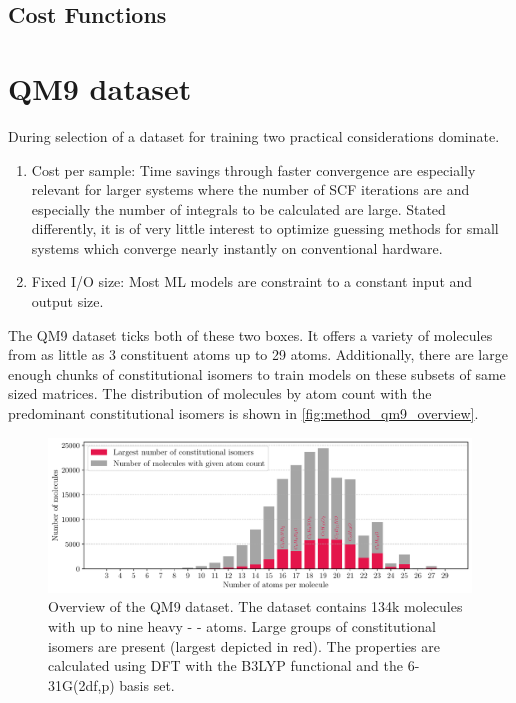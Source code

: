 \subsection{Cost Functions}
\label{subsec:background_cost_function}

\section{QM9 dataset \parencite{ref:data_qm9}}
\label{sec:qm9}
During selection of a dataset for training two practical considerations dominate. 
\begin{enumerate}
    \item Cost per sample: Time savings through faster convergence are especially relevant for larger systems where the number of SCF iterations are and especially the number of integrals to be calculated are large. Stated differently, it is of very little interest to optimize guessing methods for small systems which converge nearly instantly on conventional hardware. 
    \item Fixed I/O size: Most ML models are constraint to a constant input and output size. 
\end{enumerate}
The QM9 dataset \parencite{ref:article1_qm9,ref:article2_qm9} ticks both of these two boxes. It offers a variety of molecules from as little as 3 constituent atoms up to 29 atoms. Additionally, there are large enough chunks of constitutional isomers to train models on these subsets of same sized matrices. The distribution of molecules by atom count with the predominant constitutional isomers is shown in \autoref{fig:method_qm9_overview}.
\begin{figure}[H]
    \centering
    \includegraphics[width=\textwidth]{../fig/qm9_general/qm9_overview_stacked_bar.pdf}
    \caption[QM9 dataset overview]{Overview of the QM9 dataset. The dataset contains 134k molecules with up to nine heavy -     - atoms. Large groups of constitutional isomers are present (largest depicted in red). The properties are calculated using DFT with the B3LYP functional and the 6-31G(2df,p) basis set.}
    \label{fig:method_qm9_overview}
\end{figure}

